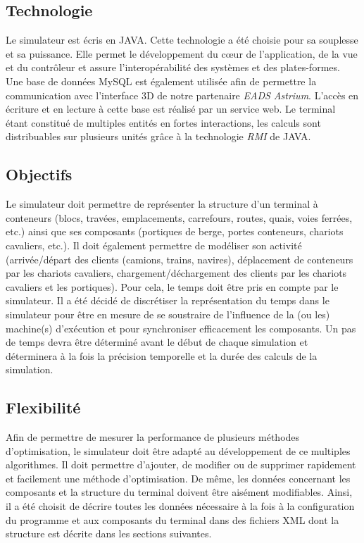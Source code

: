 
\subsection{Technologie}

Le simulateur est écris en JAVA. Cette technologie a été choisie pour sa souplesse et sa puissance. Elle permet le développement du c\oe{}ur de l'application, de la vue et du contrôleur et assure l'interopérabilité des systèmes et des plates-formes. Une base de données MySQL est également utilisée afin de permettre la communication avec l'interface 3D de notre partenaire \textit{EADS Astrium}. L'accès en écriture et en lecture à cette base est réalisé  par un service web. Le terminal étant constitué de multiples entités en fortes interactions, les calculs sont distribuables sur plusieurs unités grâce à la technologie \textit{RMI} de JAVA.


\subsection{Objectifs}

Le simulateur doit permettre de représenter la structure d'un terminal à conteneurs (blocs, travées, emplacements, carrefours, routes, quais, voies ferrées, etc.) ainsi que ses composants (portiques de berge, portes conteneurs, chariots cavaliers, etc.). Il doit également permettre de modéliser son activité (arrivée/départ des clients (camions, trains, navires), déplacement de conteneurs par les chariots cavaliers, chargement/déchargement des clients par les chariots cavaliers et les portiques). Pour cela, le temps doit être pris en compte par le simulateur. Il a été décidé de discrétiser la représentation du temps dans le simulateur pour être en mesure de se soustraire de l'influence de la (ou les) machine(s) d'exécution et pour synchroniser efficacement les composants. Un pas de temps devra être déterminé avant le début de chaque simulation et déterminera à la fois la précision temporelle et la durée des calculs de la simulation.

\subsection{Flexibilité}

Afin de permettre de mesurer la performance de plusieurs méthodes d'optimisation, le simulateur doit être adapté au développement de ce multiples algorithmes. Il doit permettre d'ajouter, de modifier ou de supprimer rapidement et facilement une méthode d'optimisation. De même, les données concernant les composants et la structure du terminal doivent être aisément modifiables. Ainsi, il a été choisit de décrire toutes les données nécessaire à la fois à la configuration du programme et aux composants du terminal dans des fichiers XML dont la structure est décrite dans les sections suivantes.
